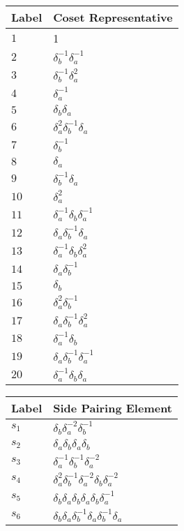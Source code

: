 \documentclass{article}
\begin{document}
\begin{center}
\begin{tabular}{ll}
\toprule
Label & Coset Representative\\
\midrule
$1$ & 1 \\
$2$ & $\delta_b^{-1}\delta_a^{-1}$ \\
$3$ & $\delta_b^{-1}\delta_a^{2}$ \\
$4$ & $\delta_a^{-1}$ \\
$5$ & $\delta_b^{}\delta_a^{}$ \\
$6$ & $\delta_a^{2}\delta_b^{-1}\delta_a^{}$ \\
$7$ & $\delta_b^{-1}$ \\
$8$ & $\delta_a^{}$ \\
$9$ & $\delta_b^{-1}\delta_a^{}$ \\
$10$ & $\delta_a^{2}$ \\
$11$ & $\delta_a^{-1}\delta_b^{}\delta_a^{-1}$ \\
$12$ & $\delta_a^{}\delta_b^{-1}\delta_a^{}$ \\
$13$ & $\delta_a^{-1}\delta_b^{}\delta_a^{2}$ \\
$14$ & $\delta_a^{}\delta_b^{-1}$ \\
$15$ & $\delta_b^{}$ \\
$16$ & $\delta_a^{2}\delta_b^{-1}$ \\
$17$ & $\delta_a^{}\delta_b^{-1}\delta_a^{2}$ \\
$18$ & $\delta_a^{-1}\delta_b^{}$ \\
$19$ & $\delta_a^{}\delta_b^{-1}\delta_a^{-1}$ \\
$20$ & $\delta_a^{-1}\delta_b^{}\delta_a^{}$ \\
\bottomrule
\end{tabular}
\hfill
\begin{tabular}{ll}
\toprule
Label & Side Pairing Element\\
\midrule
$s_{1}$ & $\delta_b^{}\delta_a^{-2}\delta_b^{-1}$ \\
$s_{2}$ & $\delta_a^{}\delta_b^{}\delta_a^{}\delta_b^{}$ \\
$s_{3}$ & $\delta_a^{-1}\delta_b^{-1}\delta_a^{-2}$ \\
$s_{4}$ & $\delta_a^{2}\delta_b^{-1}\delta_a^{-2}\delta_b^{}\delta_a^{-2}$ \\
$s_{5}$ & $\delta_b^{}\delta_a^{}\delta_b^{}\delta_a^{}\delta_b^{}\delta_a^{-1}\
$ \\
$s_{6}$ & $\delta_b^{}\delta_a^{}\delta_b^{-1}\delta_a^{}\delta_b^{-1}\delta_a^\
{}$ \\

\end{tabular}
\end{center}
\end{document}
